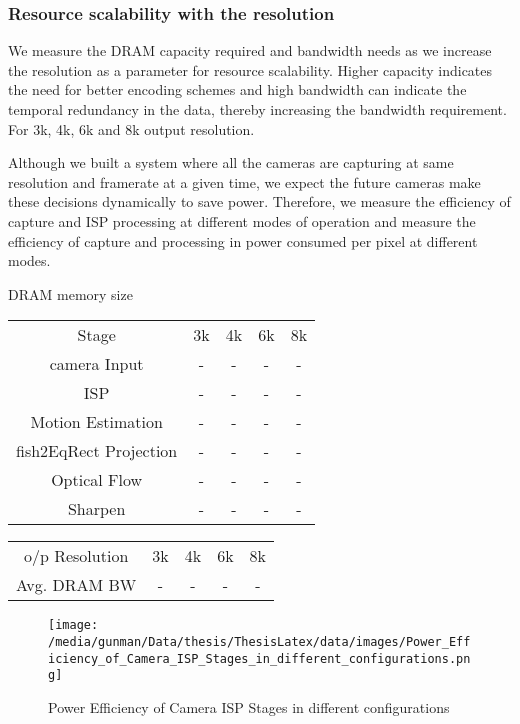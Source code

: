 \subsubsection{Resource scalability with the resolution}
We measure the DRAM capacity required and bandwidth needs as we increase the resolution as a parameter for resource scalability. Higher capacity indicates the need for better encoding schemes and high bandwidth can indicate the temporal redundancy in the data, thereby increasing the bandwidth requirement. For 3k, 4k, 6k and 8k output resolution.

Although we built a system where all the cameras are capturing at same resolution and framerate at a given time, we expect the future cameras make these decisions dynamically to save power. Therefore, we  measure the efficiency of capture and ISP processing at different modes of operation and measure the efficiency of capture and processing in power consumed per pixel at different modes.

DRAM memory size\newline
\begin{tabular}{c|c|c|c|c}
	Stage & 3k & 4k & 6k & 8k \\
	camera Input & - & - & - & - \\
	ISP & - & - & - & - \\
	Motion Estimation & - & - & - & - \\
	fish2EqRect Projection & - & - & - & - \\
	Optical Flow & - & - & - & - \\
	Sharpen & - & - & - & - \\
\end{tabular} 

\vspace{10mm}
\begin{tabular}{c|c|c|c|c}
	o/p Resolution & 3k & 4k & 6k & 8k \\
	Avg. DRAM BW & - & - & - & - \\
\end{tabular} 
\vspace{30mm}

\begin{figure*}
	\begin{center}
		\texttt{[image: /media/gunman/Data/thesis/ThesisLatex/data/images/Power\_Efficiency\_of\_Camera\_ISP\_Stages\_in\_different\_configurations.png]}
		\caption{Power Efficiency of Camera ISP Stages in different configurations}
		\label{fig:ex_4_9}
	\end{center}
	\vspace{-0.3in}
\end{figure*} 

